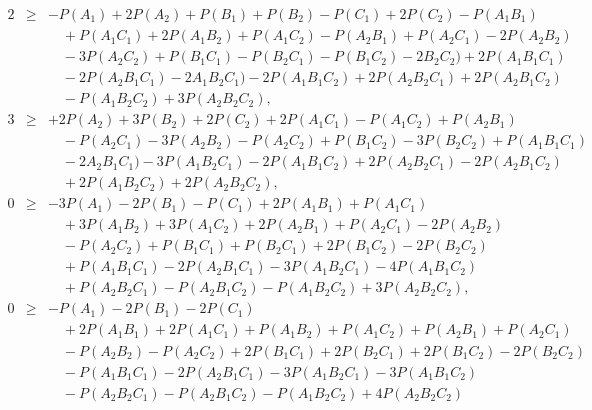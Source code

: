 \begin{eqnarray}
2&\ge& -P(A_1)+2P(A_2)+P(B_1)+P(B_2)-P(C_1)+2P(C_2)-P(A_1B_1)
\nonumber\\&&\quad
+P(A_1C_1)+2P(A_1B_2)+P(A_1C_2)-P(A_2B_1)+P(A_2C_1)-2P(A_2B_2)
\nonumber\\&&\quad
-3P(A_2C_2)+P(B_1C_1)- P(B_2C_1)- P(B_1C_2)-2B_2C_2)+2P(A_1B_1C_1)
\nonumber\\&&\quad
-2P(A_2B_1C_1)-2A_1B_2C_1)-2P(A_1B_1C_2)+2P(A_2B_2C_1)+2P(A_2B_1C_2)
\nonumber\\&&\quad
-P(A_1B_2C_2)+3P(A_2B_2C_2)
\label{eghz-5}
,\\
3&\ge& +2P(A_2)+3P(B_2)+2P(C_2)+2P(A_1C_1)-P(A_1C_2)+P(A_2B_1)
\nonumber\\&&\quad
-P(A_2C_1)-3P(A_2B_2)-P(A_2C_2)+P(B_1C_2)-3P(B_2C_2)+P(A_1B_1C_1)
\nonumber\\&&\quad
-2A_2B_1C_1)-3P(A_1B_2C_1)-2P(A_1B_1C_2)+2P(A_2B_2C_1)-2P(A_2B_1C_2)
\nonumber\\&&\quad
+2P(A_1B_2C_2)+2P(A_2B_2C_2)
\label{eghz-6}
,\\
 0 &\ge&  -3P(A_1) -2P(B_1) - P(C_1) +2P(A_1B_1) + P(A_1C_1)
\nonumber\\&&\quad
 +3P(A_1B_2) +3P(A_1C_2) +2P(A_2B_1) + P(A_2C_1) -2P(A_2B_2)
\nonumber\\&&\quad
- P(A_2C_2) + P(B_1C_1) + P(B_2C_1) +2P(B_1C_2) -2P(B_2C_2)
\nonumber\\&&\quad
+ P(A_1B_1C_1) -2P(A_2B_1C_1) -3P(A_1B_2C_1) -4P(A_1B_1C_2)
\nonumber\\&&\quad
+ P(A_2B_2C_1) - P(A_2B_1C_2) - P(A_1B_2C_2) +3P(A_2B_2C_2)
\label{eghz-7}
,\\
 0 &\ge& - P(A_1) - 2P(B_1) - 2P(C_1)
\nonumber\\&&\quad
+2P(A_1B_1) + 2P(A_1C_1) + P(A_1B_2) + P(A_1C_2) + P(A_2B_1) + P(A_2C_1)
\nonumber\\&&\quad
- P(A_2B_2) - P(A_2C_2) + 2P(B_1C_1) + 2P(B_2C_1) + 2P(B_1C_2) - 2P(B_2C_2)
\nonumber\\&&\quad
- P(A_1B_1C_1) - 2P(A_2B_1C_1) - 3P(A_1B_2C_1) - 3P(A_1B_1C_2)
\nonumber\\&&\quad
- P(A_2B_2C_1) - P(A_2B_1C_2) - P(A_1B_2C_2) + 4P(A_2B_2C_2)
\label{eghz-8}
\end{eqnarray}

